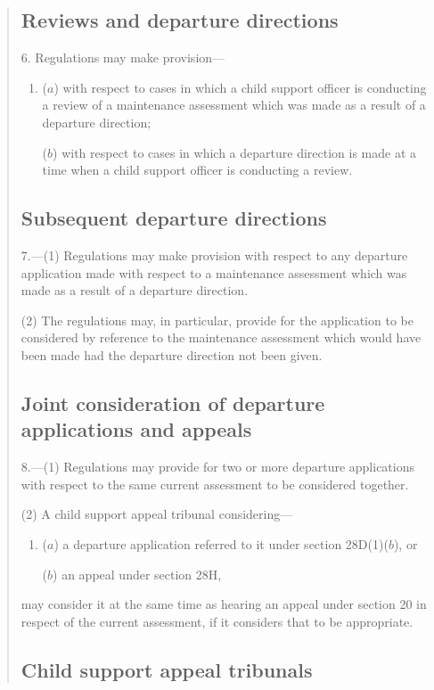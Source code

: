 \documentclass[a4paper]{article}
\begin{document}
{\begin{quotation}
\subsection*{Reviews and departure directions}

6. Regulations may make provision—
\begin{enumerate}\item[]
($a$) with respect to cases in which a child support officer is conducting a review of a maintenance assessment which was made as a result of a departure direction;

($b$) with respect to cases in which a departure direction is made at a time when a child support officer is conducting a review.
\end{enumerate}

\subsection*{Subsequent departure directions}

7.---(1) Regulations may make provision with respect to any departure application made with respect to a maintenance assessment which was made as a result of a departure direction.

(2) The regulations may, in particular, provide for the application to be considered by reference to the maintenance assessment which would have been made had the departure direction not been given.

\subsection*{Joint consideration of departure applications and appeals}

8.---(1) Regulations may provide for two or more departure applications with respect to the same current assessment to be considered together.

(2) A child support appeal tribunal considering—
\begin{enumerate}\item[]
($a$) a departure application referred to it under section 28D(1)($b$), or

($b$) an appeal under section 28H,
\end{enumerate}
may consider it at the same time as hearing an appeal under section 20 in respect of the current assessment, if it considers that to be appropriate.

\subsection*{Child support appeal tribunals}


\end{quotation}}
\end{document}

